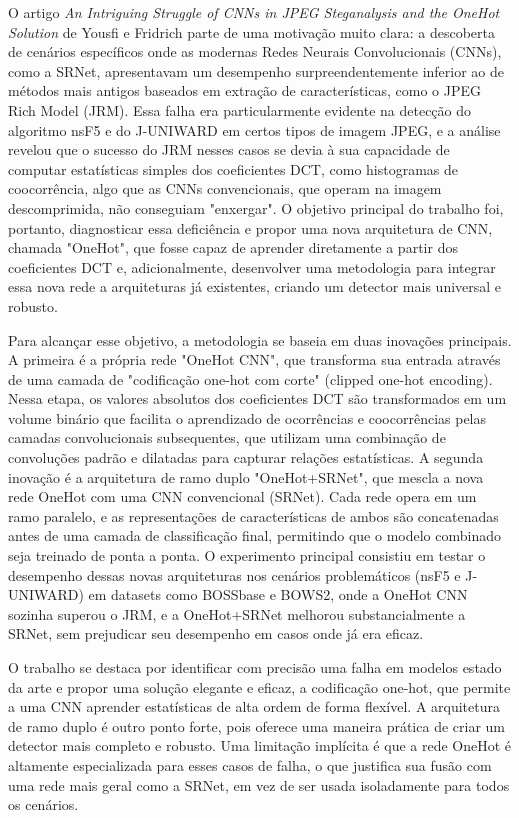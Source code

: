\documentclass[12pt]{article}
\begin{document}
O artigo \textit{An Intriguing Struggle of CNNs in JPEG Steganalysis and the
  OneHot Solution} de Yousfi e Fridrich \cite{fridrichOnehot} parte de uma
motivação muito clara: a descoberta de cenários específicos onde as modernas
Redes Neurais Convolucionais (CNNs), como a SRNet, apresentavam um desempenho
surpreendentemente inferior ao de métodos mais antigos baseados em extração de
características, como o JPEG Rich Model (JRM). Essa falha era particularmente
evidente na detecção do algoritmo nsF5 e do J-UNIWARD em certos tipos de imagem
JPEG, e a análise revelou que o sucesso do JRM nesses casos se devia à sua
capacidade de computar estatísticas simples dos coeficientes DCT, como
histogramas de coocorrência, algo que as CNNs convencionais, que operam na
imagem descomprimida, não conseguiam "enxergar". O objetivo principal do
trabalho foi, portanto, diagnosticar essa deficiência e propor uma nova
arquitetura de CNN, chamada "OneHot", que fosse capaz de aprender diretamente a
partir dos coeficientes DCT e, adicionalmente, desenvolver uma metodologia para
integrar essa nova rede a arquiteturas já existentes, criando um detector mais
universal e robusto.

Para alcançar esse objetivo, a metodologia se baseia em duas inovações
principais. A primeira é a própria rede "OneHot CNN", que transforma sua
entrada através de uma camada de "codificação one-hot com corte" (clipped
one-hot encoding). Nessa etapa, os valores absolutos dos coeficientes DCT são
transformados em um volume binário que facilita o aprendizado de ocorrências e
coocorrências pelas camadas convolucionais subsequentes, que utilizam uma
combinação de convoluções padrão e dilatadas para capturar relações
estatísticas. A segunda inovação é a arquitetura de ramo duplo "OneHot+SRNet",
que mescla a nova rede OneHot com uma CNN convencional (SRNet). Cada rede opera
em um ramo paralelo, e as representações de características de ambos são
concatenadas antes de uma camada de classificação final, permitindo que o
modelo combinado seja treinado de ponta a ponta. O experimento principal
consistiu em testar o desempenho dessas novas arquiteturas nos cenários
problemáticos (nsF5 e J-UNIWARD) em datasets como BOSSbase e BOWS2, onde a
OneHot CNN sozinha superou o JRM, e a OneHot+SRNet melhorou substancialmente a
SRNet, sem prejudicar seu desempenho em casos onde já era eficaz.

O trabalho se destaca por identificar com precisão uma falha em modelos estado
da arte e propor uma solução elegante e eficaz, a codificação one-hot, que
permite a uma CNN aprender estatísticas de alta ordem de forma flexível. A
arquitetura de ramo duplo é outro ponto forte, pois oferece uma maneira prática
de criar um detector mais completo e robusto. Uma limitação implícita é que a
rede OneHot é altamente especializada para esses casos de falha, o que
justifica sua fusão com uma rede mais geral como a SRNet, em vez de ser usada
isoladamente para todos os cenários.
\end{document}
